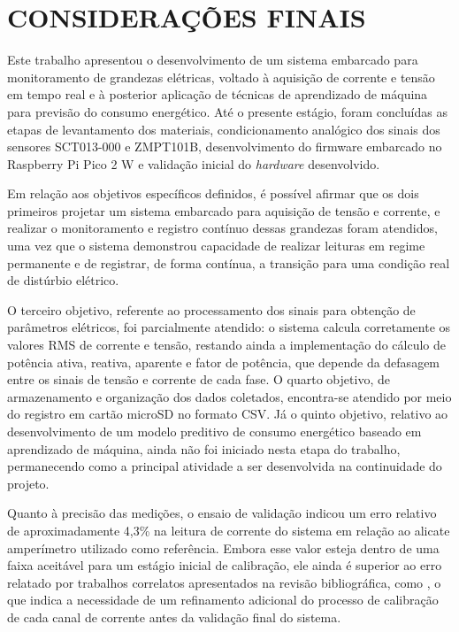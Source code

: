 \chapter{CONSIDERAÇÕES FINAIS}{}
Este trabalho apresentou o desenvolvimento de um sistema embarcado para
monitoramento de grandezas elétricas, voltado à aquisição de corrente e
tensão em tempo real e à posterior aplicação de técnicas de aprendizado
de máquina para previsão do consumo energético. Até o presente estágio,
foram concluídas as etapas de levantamento dos materiais, condicionamento
analógico dos sinais dos sensores SCT013-000 e ZMPT101B, desenvolvimento
do firmware embarcado no Raspberry Pi Pico 2 W e validação inicial do
\textit{hardware} desenvolvido.

Em relação aos objetivos específicos definidos, é
possível afirmar que os dois primeiros projetar um sistema embarcado
para aquisição de tensão e corrente, e realizar o monitoramento e
registro contínuo dessas grandezas foram atendidos, uma vez que o
sistema demonstrou capacidade de realizar leituras em regime permanente
e de registrar, de forma contínua, a transição para uma condição real
de distúrbio elétrico.

O terceiro objetivo, referente ao processamento dos sinais para
obtenção de parâmetros elétricos, foi parcialmente atendido: o sistema
calcula corretamente os valores RMS de corrente e tensão, restando
ainda a implementação do cálculo de potência ativa, reativa, aparente
e fator de potência, que depende da defasagem entre os sinais de
tensão e corrente de cada fase. O quarto objetivo, de armazenamento e
organização dos dados coletados, encontra-se atendido por meio do
registro em cartão microSD no formato CSV. Já o quinto objetivo,
relativo ao desenvolvimento de um modelo preditivo de consumo
energético baseado em aprendizado de máquina, ainda não foi iniciado
nesta etapa do trabalho, permanecendo como a principal atividade a ser
desenvolvida na continuidade do projeto.

Quanto à precisão das medições, o ensaio de validação indicou um erro relativo de
aproximadamente 4,3\% na leitura de corrente do sistema em relação ao
alicate amperímetro utilizado como referência. Embora esse valor esteja
dentro de uma faixa aceitável para um estágio inicial de calibração,
ele ainda é superior ao erro relatado por trabalhos correlatos
apresentados na revisão bibliográfica, como , o que indica a necessidade de um refinamento adicional do
processo de calibração de cada canal de corrente antes da validação
final do sistema.


